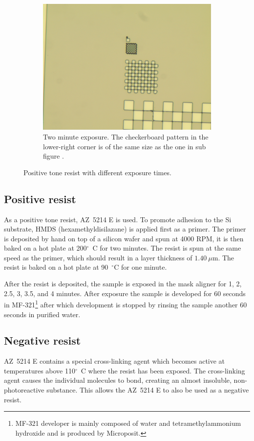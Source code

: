 \begin{figure}[!b]
\begin{subfigure}[t]{0.3\linewidth}
        \centering
        \includegraphics[width=\textwidth]{data/b3a1.jpg}
        \caption{Two minute exposure. The checkerboard pattern in the lower-right corner is of the same size as the one in sub figure .}
        \label{fig:b3a1}
    \end{subfigure}
    \caption{Positive tone resist with different exposure times.}
\end{figure}

\subsection*{Positive resist}
As a positive tone resist, AZ~5214 E is used. To promote adhesion to the Si substrate, HMDS (hexamethyldisilazane) is applied first as a primer. The primer is deposited by hand on top of a silicon wafer and spun at 4000 RPM, it is then baked on a hot plate at 200$^{\circ}$~C for two minutes. The resist is spun at the same speed as the primer, which should result in a layer thickness of $1.40~\mu$m. The resist is baked on a hot plate at 90~$^{\circ}$C for one minute.

After the resist is deposited, the sample is exposed in the mask aligner for 1, 2, 2.5, 3, 3.5, and 4 minutes. After exposure the sample is developed for 60 seconds in MF-321\footnote{MF-321 developer is mainly composed of water and tetramethylammonium hydroxide and is produced by Microposit.} after which development is stopped by rinsing the sample another 60 seconds in purified water.

\subsection*{Negative resist}
AZ~5214 E contains a special cross-linking agent which becomes active at temperatures above 110$^{\circ}$~C where the resist has been exposed. The cross-linking agent causes the individual molecules to bond, creating an almost insoluble, non-photoreactive substance. This allows the AZ~5214 E to also be used as a negative resist.

